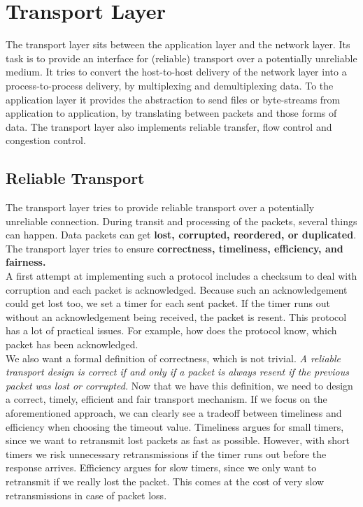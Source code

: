 \section{Transport Layer}
The transport layer sits between the application layer and the network layer. Its task is to provide an interface for (reliable) transport over a potentially unreliable medium. It tries to convert the host-to-host delivery of the network layer into a process-to-process delivery, by multiplexing and demultiplexing data. To the application layer it provides the abstraction to send files or byte-streams from application to application, by translating between packets and those forms of data. The transport layer also implements reliable transfer, flow control and congestion control.

\subsection{Reliable Transport}
The transport layer tries to provide reliable transport over a potentially unreliable connection. During transit and processing of the packets, several things can happen. Data packets can get \textbf{lost, corrupted, reordered, or duplicated}. The transport layer tries to ensure \textbf{correctness, timeliness,  efficiency, and fairness.} \vspace{.3cm}\\
A first attempt at implementing such a protocol includes a checksum to deal with corruption and each packet is acknowledged. Because such an acknowledgement could get lost too, we set a timer for each sent packet. If the timer runs out without an acknowledgement being received, the packet is resent. This protocol has a lot of practical issues. For example, how does the protocol know, which packet has been acknowledged. \vspace{.3cm}\\
We also want a formal definition of correctness, which is not trivial. \textit{A reliable transport design is correct if and only if a packet is always resent if the previous packet was lost or corrupted.} Now that we have this definition, we need to design a correct, timely, efficient and fair transport mechanism. If we focus on the aforementioned approach, we can clearly see a tradeoff between timeliness and efficiency when choosing the timeout value. Timeliness argues for small timers, since we want to retransmit lost packets as fast as possible. However, with short timers we risk unnecessary retransmissions if the timer runs out before the response arrives. Efficiency argues for slow timers, since we only want to retransmit if we really lost the packet. This comes at the cost of very slow retransmissions in case of packet loss. \vspace{.3cm}\\
